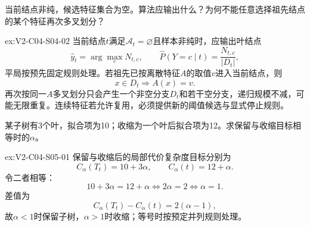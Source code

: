 \begin{SLChapterExercisePairSection}
\begin{exercise}\label{ex:V2-C04-S04-02}
当前结点非纯，候选特征集合为空。算法应输出什么？为何不能任意选择祖先结点的某个特征再次多叉划分？
\end{exercise}
\ifSLFullEdition
{}\label{sol:V2-C04-S04-02}
\begin{chapterexercisesolution}{ex:V2-C04-S04-02}
当前结点$t$满足$\mathcal A_t=\varnothing$且样本非纯时，应输出叶结点
\[
\widehat y_t=\arg\max_c N_{t,c},
\qquad
\widehat P(Y=c\mid t)=\frac{N_{t,c}}{|D_t|},
\]
平局按预先固定规则处理。若祖先已按离散特征$A$的取值$v$进入当前结点，则
\[
x\in D_t\Longrightarrow A(x)=v.
\]
再次按同一$A$多叉划分只会产生一个非空分支$D_t$和若干空分支，递归规模不减，可能无限重复。连续特征若允许复用，必须提供新的阈值候选与显式停止规则。
\end{chapterexercisesolution}
\fi

\begin{exercise}\label{ex:V2-C04-S05-01}
某子树有3个叶，拟合项为10；收缩为一个叶后拟合项为12。求保留与收缩目标相等时的$\alpha$。
\end{exercise}
\ifSLFullEdition
{}\label{sol:V2-C04-S05-01}
\begin{chapterexercisesolution}{ex:V2-C04-S05-01}
保留与收缩后的局部代价复杂度目标分别为
\[
C_\alpha(T_t)=10+3\alpha,
\qquad
C_\alpha(t)=12+\alpha.
\]
令二者相等：
\[
10+3\alpha=12+\alpha
\Longleftrightarrow
2\alpha=2
\Longleftrightarrow
\alpha=1.
\]
差值为
\[
C_\alpha(T_t)-C_\alpha(t)=2(\alpha-1),
\]
故$\alpha<1$时保留子树，$\alpha>1$时收缩；等号时按预定并列规则处理。
\end{chapterexercisesolution}
\fi


\end{SLChapterExercisePairSection}

